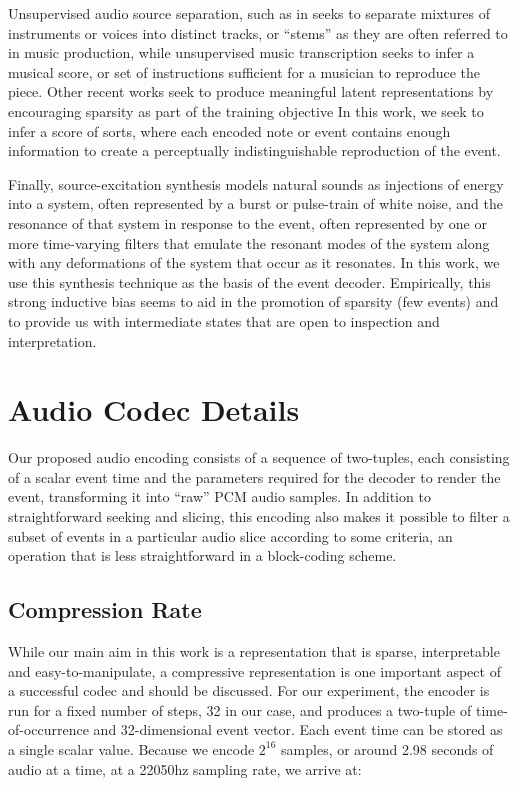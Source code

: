 \documentclass[9pt,conference]{IEEEtran}
\begin{document}
Unsupervised audio source separation, such as 
in\cite{schulzeforster2023unsupervisedmusicsourceseparation} seeks to separate mixtures of
instruments or voices into distinct tracks, or ``stems'' as they are often referred to in 
music production, while unsupervised music transcription\cite{NIPS2014_e51e118b} seeks to infer
a musical score, or set of instructions sufficient for a musician to reproduce the piece.  
Other recent works seek to produce meaningful latent representations by encouraging sparsity 
as part of the training objective\cite{lisboa2024spikingmusicaudiocompression}
In this work, we seek to infer a score of sorts, where each encoded note or event contains 
enough information to create a perceptually indistinguishable reproduction of the event.

Finally, source-excitation synthesis\cite{fant1960acoustic} models natural sounds as injections 
of energy into a system, often represented by a burst or pulse-train of white noise, and the
resonance of that system in response to the event, often represented by one or more time-varying
filters that emulate the resonant modes of the system along with any deformations of the system that occur as it 
resonates.  In this work, we use this synthesis technique as the basis of the event decoder.  Empirically, this 
strong inductive bias seems to aid in the promotion of sparsity (few events) and to provide us with
intermediate states that are open to inspection and interpretation.


\section{Audio Codec Details}
\label{sec:model}

Our proposed audio encoding consists of a sequence of two-tuples, each consisting of
a scalar event time and the parameters required for the decoder to render
the event, transforming it into ``raw'' PCM audio samples.  In addition to
straightforward seeking and slicing, this encoding also makes it possible to 
filter a subset of events in a particular audio slice according to some 
criteria, an operation that is less straightforward in a block-coding scheme.



\subsection{Compression Rate}
\label{ssec:compression_rate}


While our main aim in this work is a representation 
that is sparse, interpretable and easy-to-manipulate, a
compressive representation is one important aspect of a successful codec and should be discussed.
For our experiment, the encoder is run for a fixed number of steps, 32 in our case,
and produces a two-tuple of time-of-occurrence and 32-dimensional event vector.  
Each event time can be stored as a single scalar value.
Because we encode ${2^{16}}$ samples, or around 2.98 seconds of audio at a time, 
at a 22050hz sampling rate, we arrive at:
\end{document}
